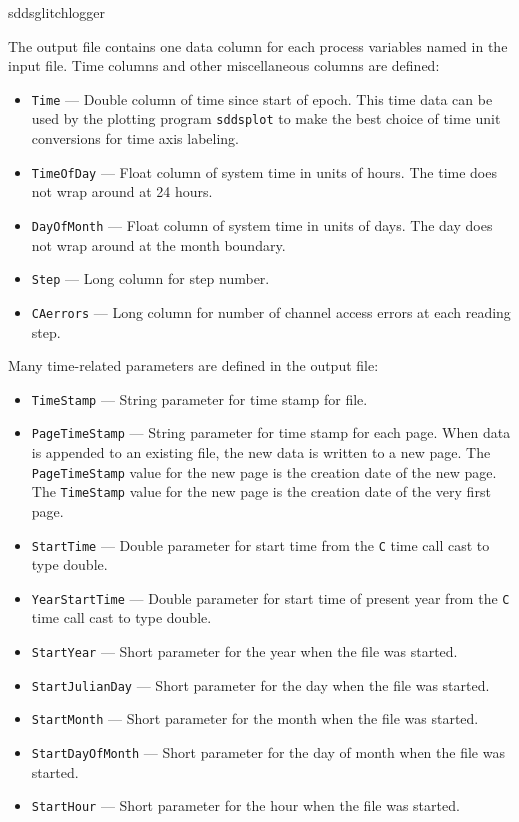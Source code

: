 \begin{sddsprog}{sddsglitchlogger}
\begin{itemize}
The output file contains one data column for each process variables named in the input file. 
Time columns and other miscellaneous columns are defined: 
\begin{itemize}
        \item {\tt Time} --- Double column of time since start of epoch. This time data can be used by
        the plotting program {\verb+sddsplot+} to make the best choice of time unit conversions
        for time axis labeling.
        \item {\tt TimeOfDay} --- Float column of system time in units of hours. 
        The time does not wrap around at 24 hours.
        \item {\tt DayOfMonth} --- Float column of system time in units of days. 
        The day does not wrap around at the month boundary.
        \item {\tt Step} --- Long column for step number.
        \item {\tt CAerrors} --- Long column for number of channel access errors at each reading step. 
\end{itemize}

Many time-related parameters are defined in the output file:
\begin{itemize}
        \item {\tt TimeStamp} --- String parameter for time stamp for file.
        \item {\tt PageTimeStamp} --- String parameter for time stamp for each page. When data
                is appended to an existing file, the new data is written to a new
                page. The {\tt PageTimeStamp} value for the new page is the creation
                date of the new page. The {\tt TimeStamp} value for the new page is the creation 
                date of the very first page.
        \item {\tt StartTime} --- Double parameter for start time from the {\tt C} time call cast to type double.
        \item {\tt YearStartTime} --- Double parameter for start time of present year from the {\tt C} time call cast to type double.
        \item {\verb+StartYear+} --- Short parameter for the year when the file was started.
        \item {\verb+StartJulianDay+} --- Short parameter for the day when the file was started.
        \item {\verb+StartMonth+} --- Short parameter for the month when the file was started.
        \item {\verb+StartDayOfMonth+} --- Short parameter for the day of month when the file was started.
        \item {\verb+StartHour+} --- Short parameter for the hour when the file was started.
\end{itemize}
\end{itemize}


\end{sddsprog}
